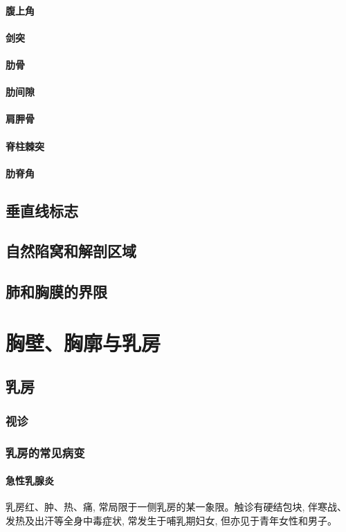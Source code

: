 \documentclass[UTF8]{ctexbook}
\begin{document}
\paragraph{腹上角}
\paragraph{剑突}
\paragraph{肋骨}
\paragraph{肋间隙}
\paragraph{肩胛骨}
\paragraph{脊柱棘突}
\paragraph{肋脊角}

\subsection{垂直线标志}
\subsection{自然陷窝和解剖区域}
\subsection{肺和胸膜的界限}
\section{胸壁、胸廓与乳房}
\subsection{乳房}
\subsubsection{视诊}
\subsubsection{乳房的常见病变}
\paragraph{急性乳腺炎}乳房红、肿、热、痛, 常局限于一侧乳房的某一象限。触诊有硬结包块, 伴寒战、发热及出汗等全身中毒症状, 常发生于哺乳期妇女, 但亦见于青年女性和男子。
\end{document}
